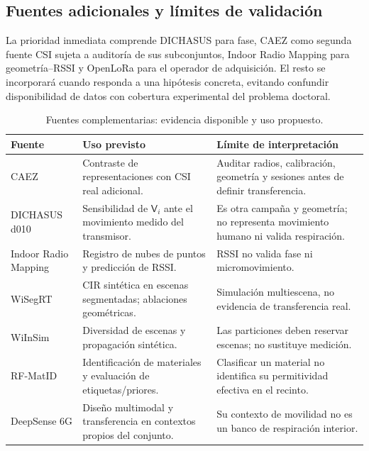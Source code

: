 \subsection{Fuentes adicionales y límites de validación}

La prioridad inmediata comprende DICHASUS para fase, CAEZ como segunda fuente CSI
sujeta a auditoría de sus subconjuntos, Indoor Radio Mapping para geometría--RSSI
y OpenLoRa para el operador de adquisición. El resto se incorporará cuando responda
a una hipótesis concreta, evitando confundir disponibilidad de datos con cobertura
experimental del problema doctoral.

\begin{table}[htbp]
\centering\small
\caption{Fuentes complementarias: evidencia disponible y uso propuesto.}
\label{tab:additional_datasets}
\begin{tabularx}{\textwidth}{P{3.0cm}L L}
\toprule
Fuente & Uso previsto & Límite de interpretación\\
\midrule
CAEZ \citep{ETHCAEZ,Zumegen2024CAEZWiFi} & Contraste de representaciones con CSI real adicional. & Auditar radios, calibración, geometría y sesiones antes de definir transferencia.\\
DICHASUS d010 \citep{DICHASUSd010Web} & Sensibilidad de $\mathsf V_i$ ante el movimiento medido del transmisor. & Es otra campaña y geometría; no representa movimiento humano ni valida respiración.\\
Indoor Radio Mapping \citep{Milosheski2026IndoorMapping} & Registro de nubes de puntos y predicción de RSSI. & RSSI no valida fase ni micromovimiento.\\
WiSegRT \citep{Zhang2023WiSegRT} & CIR sintética en escenas segmentadas; ablaciones geométricas. & Simulación multiescena, no evidencia de transferencia real.\\
WiInSim \citep{QualcommWiInSim} & Diversidad de escenas y propagación sintética. & Las particiones deben reservar escenas; no sustituye medición.\\
RF-MatID \citep{Chen2026RFMatID} & Identificación de materiales y evaluación de etiquetas/priores. & Clasificar un material no identifica su permitividad efectiva en el recinto.\\
DeepSense 6G \citep{Alkhateeb2022DeepSense} & Diseño multimodal y transferencia en contextos propios del conjunto. & Su contexto de movilidad no es un banco de respiración interior.\\
\bottomrule
\end{tabularx}
\end{table}

